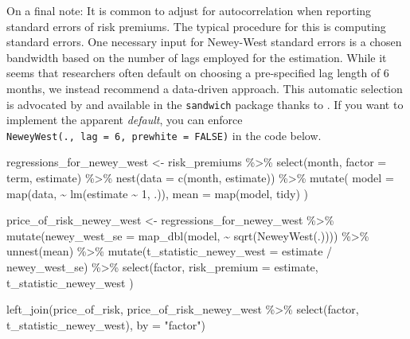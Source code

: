 \documentclass[
]{krantz}
\newenvironment{Shaded}{\begin{snugshade}}{\end{snugshade}}
\newcommand{\AttributeTok}[1]{\textcolor[rgb]{0.61,0.61,0.61}{#1}}
\newcommand{\DecValTok}[1]{\textcolor[rgb]{0.06,0.06,0.06}{#1}}
\newcommand{\FunctionTok}[1]{\textcolor[rgb]{0,0,0}{#1}}
\newcommand{\NormalTok}[1]{#1}
\newcommand{\OtherTok}[1]{\textcolor[rgb]{0.37,0.37,0.37}{#1}}
\newcommand{\SpecialCharTok}[1]{\textcolor[rgb]{0,0,0}{#1}}
\newcommand{\StringTok}[1]{\textcolor[rgb]{0.5,0.5,0.5}{#1}}
\begin{document}
On a final note: It is common to adjust for autocorrelation when reporting standard errors of risk premiums. The typical procedure for this is computing \citet{Newey1987} standard errors. One necessary input for Newey-West standard errors is a chosen bandwidth based on the number of lags employed for the estimation. While it seems that researchers often default on choosing a pre-specified lag length of 6 months, we instead recommend a data-driven approach. This automatic selection is advocated by \citet{Newey1994} and available in the \texttt{sandwich} package thanks to \citet{Zeileis2004}. If you want to implement the apparent \emph{default}, you can enforce \texttt{NeweyWest(.,\ lag\ =\ 6,\ prewhite\ =\ FALSE)} in the code below.

\begin{Shaded}
\begin{Highlighting}[]
\NormalTok{regressions\_for\_newey\_west }\OtherTok{\textless{}{-}}\NormalTok{ risk\_premiums }\SpecialCharTok{\%\textgreater{}\%}
  \FunctionTok{select}\NormalTok{(month, }\AttributeTok{factor =}\NormalTok{ term, estimate) }\SpecialCharTok{\%\textgreater{}\%}
  \FunctionTok{nest}\NormalTok{(}\AttributeTok{data =} \FunctionTok{c}\NormalTok{(month, estimate)) }\SpecialCharTok{\%\textgreater{}\%}
  \FunctionTok{mutate}\NormalTok{(}
    \AttributeTok{model =} \FunctionTok{map}\NormalTok{(data, }\SpecialCharTok{\textasciitilde{}} \FunctionTok{lm}\NormalTok{(estimate }\SpecialCharTok{\textasciitilde{}} \DecValTok{1}\NormalTok{, .)),}
    \AttributeTok{mean =} \FunctionTok{map}\NormalTok{(model, tidy)}
\NormalTok{  )}

\NormalTok{price\_of\_risk\_newey\_west }\OtherTok{\textless{}{-}}\NormalTok{ regressions\_for\_newey\_west }\SpecialCharTok{\%\textgreater{}\%}
  \FunctionTok{mutate}\NormalTok{(}\AttributeTok{newey\_west\_se =} \FunctionTok{map\_dbl}\NormalTok{(model, }\SpecialCharTok{\textasciitilde{}} \FunctionTok{sqrt}\NormalTok{(}\FunctionTok{NeweyWest}\NormalTok{(.)))) }\SpecialCharTok{\%\textgreater{}\%}
  \FunctionTok{unnest}\NormalTok{(mean) }\SpecialCharTok{\%\textgreater{}\%}
  \FunctionTok{mutate}\NormalTok{(}\AttributeTok{t\_statistic\_newey\_west =}\NormalTok{ estimate }\SpecialCharTok{/}\NormalTok{ newey\_west\_se) }\SpecialCharTok{\%\textgreater{}\%}
  \FunctionTok{select}\NormalTok{(factor,}
    \AttributeTok{risk\_premium =}\NormalTok{ estimate,}
\NormalTok{    t\_statistic\_newey\_west}
\NormalTok{  )}

\FunctionTok{left\_join}\NormalTok{(price\_of\_risk,}
\NormalTok{          price\_of\_risk\_newey\_west }\SpecialCharTok{\%\textgreater{}\%} \FunctionTok{select}\NormalTok{(factor, t\_statistic\_newey\_west),}
          \AttributeTok{by =} \StringTok{"factor"}\NormalTok{)}
\end{Highlighting}
\end{Shaded}
\end{document}
